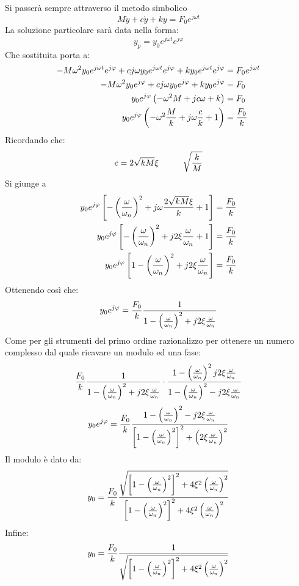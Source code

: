 \documentclass[a4paper, 15pt]{article}
\begin{document}
\begin{adjustwidth}{2in}{}
			Si passerà sempre attraverso il metodo simbolico
			\[ M\ddot{y} + c\dot{y} + ky =F_0e^{j\omega t}\]
			La soluzione particolare sarà data nella forma: 
			\[ y_p = y_0e^{j\omega t}e^{j\varphi}\]
			Che sostituita porta a:
			\[\begin{split} 
				-M\omega^2y_0e^{j\omega t}e^{j\varphi} + cj\omega y_0e^{j\omega t}e^{j\varphi} + ky_0e^{j\omega t}e^{j\varphi} & =F_0e^{j\omega t} \\
				-M\omega^2y_0e^{j\varphi} + cj\omega y_0 e^{j\varphi} + ky_0e^{j\varphi} & =F_0 \\
				y_0e^{j\varphi}\left(-\omega^2M + jc\omega + k\right) & = F_0 \\
				y_0e^{j\varphi}\left(-\omega^2{M\over k} + j\omega{c\over k}  + 1\right) & = {F_0\over k} 	
			\end{split} \]
			Ricordando che:
			\[c = 2\sqrt{kM}\xi \hspace{1cm} \sqrt{k\over M}\]
			Si giunge a
			\[
			\begin{split}
				y_0e^{j\varphi}\left[-\left({\omega\over \omega_n}\right)^2 + j\omega{2\sqrt{kM}\xi\over k}  + 1\right] & = {F_0\over k} 	\\
				y_0e^{j\varphi}\left[-\left({\omega\over \omega_n}\right)^2 + j2\xi{\omega\over \omega_n}  + 1\right] & = {F_0\over k} 	\\
				y_0e^{j\varphi}\left[1-\left({\omega\over \omega_n}\right)^2 + j2\xi{\omega\over \omega_n}\right] & = {F_0\over k}
			\end{split}
			\]
			Ottenendo così che:
			\[ y_0e^{j\varphi} = {F_0\over k} \dfrac{1}{1-\left({\omega\over \omega_n}\right)^2 + j2\xi{\omega\over \omega_n}} \]
			Come per gli strumenti del primo ordine razionalizzo per ottenere un numero complesso dal quale ricavare un modulo ed una fase:
			\[ {F_0\over k} \dfrac{1}{1-\left({\omega\over \omega_n}\right)^2 + j2\xi{\omega\over \omega_n}} \cdot \dfrac{1-\left({\omega\over \omega_n}\right)^2  j2\xi{\omega\over \omega_n}}{1-\left({\omega\over \omega_n}\right)^2 - j2\xi{\omega\over \omega_n}}\]
			\[ y_0e^{j\varphi} = {F_0\over k} \dfrac{1-\left({\omega\over \omega_n}\right)^2 - j2\xi{\omega\over \omega_n}}{\left[1-\left({\omega\over \omega_n}\right)^2\right]^2 + \left(2\xi{\omega\over \omega_n}\right)^2} \]
			Il modulo è dato da: 
			\[ y_0 = {F_0\over k} \dfrac{\sqrt{\left[1- \left(\omega\over\omega_n\right)^2\right]^2 + 4\xi^2\left(\omega\over\omega_n\right)^2}}{\left[1-\left({\omega\over \omega_n}\right)^2\right]^2 + 4\xi^2\left(\omega\over\omega_n\right)^2} \]
			Infine:
			\[ y_0 = {F_0\over k} \dfrac{1}{\sqrt{\left[1- \left(\omega\over\omega_n\right)^2\right]^2 + 4\xi^2\left(\omega\over\omega_n\right)^2}}\]

\end{adjustwidth}
\end{document}
